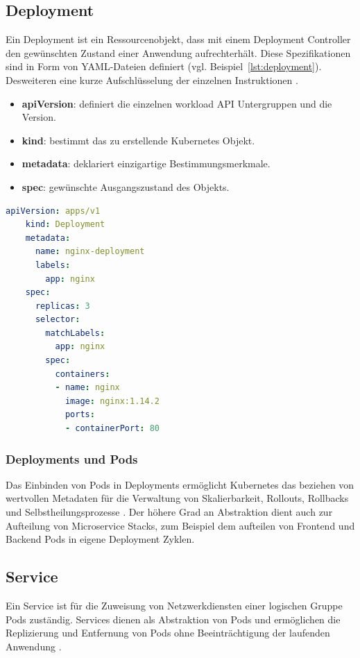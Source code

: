 \subsection{Deployment}
Ein Deployment ist ein Ressourcenobjekt, dass mit einem Deployment Controller den gewünschten Zustand einer Anwendung aufrechterhält.
Diese Spezifikationen sind in Form von YAML-Dateien definiert (vgl. Beispiel~\ref{lst:deployment}).
Desweiteren eine kurze Aufschlüsselung der einzelnen Instruktionen \cite{kubernetesobjects}.
\begin{itemize}
    \item \textbf{apiVersion}: definiert die einzelnen workload API Untergruppen und die Version.
    \item \textbf{kind}: bestimmt das zu erstellende Kubernetes Objekt.
    \item \textbf{metadata}: deklariert einzigartige Bestimmungsmerkmale.
    \item \textbf{spec}: gewünschte Ausgangszustand des Objekts.
\end{itemize}

\begin{lstlisting}[caption={deployment.yaml \cite{kubernetesdeployment} },captionpos=b,label={lst:deployment},language=yaml]
    apiVersion: apps/v1
    kind: Deployment
    metadata:
      name: nginx-deployment
      labels:
        app: nginx
    spec:
      replicas: 3
      selector:
        matchLabels:
          app: nginx
        spec:
          containers:
          - name: nginx
            image: nginx:1.14.2
            ports:
            - containerPort: 80
    \end{lstlisting}

\subsubsection{Deployments und Pods}
Das Einbinden von Pods in Deployments ermöglicht Kubernetes das beziehen von 
wertvollen Metadaten für die Verwaltung von Skalierbarkeit,
Rollouts, Rollbacks und Selbstheilungsprozesse \cite{kubernetesnigeldeployments}. Der höhere Grad an Abstraktion
dient auch zur Aufteilung von Microservice Stacks, zum Beispiel dem aufteilen
von Frontend und Backend Pods in eigene Deployment Zyklen.

\subsection{Service}
Ein Service ist für die Zuweisung von Netzwerkdiensten einer logischen Gruppe Pods zuständig.
Services dienen als Abstraktion von Pods und ermöglichen die Replizierung und Entfernung
von Pods ohne Beeinträchtigung der laufenden Anwendung \cite{kubernetesservice}.

